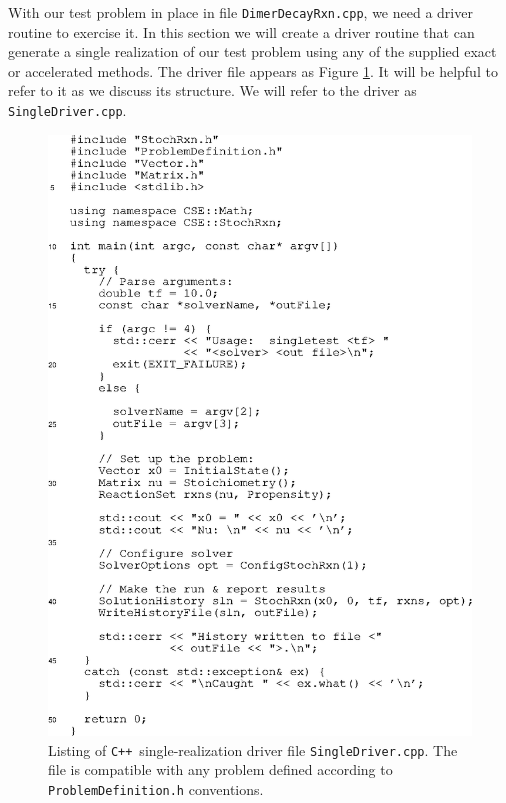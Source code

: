 \documentclass[12pt]{article}
\newcommand{\cpp}{\texttt{C++}}%
\newcommand{\api}[1]{\texttt{#1}}
\begin{document}
With our test problem in place in file \api{DimerDecayRxn.cpp}, we
need a driver routine to exercise it.  In this section we will create
a driver routine that can generate a single realization of our test
problem using any of the supplied exact or accelerated methods.  The
driver file appears as Figure \ref{singletest_cpp}. It will be
helpful to refer to it as we discuss its structure.  We will refer to
the driver as \api{SingleDriver.cpp}.
\begin{figure}[htbp]
  \centering \includegraphics{singletest_cpp.eps}
  \caption{Listing of \cpp\ single-realization driver file
           \api{SingleDriver.cpp}.  The file is compatible with any
           problem defined according to \api{Prob\-lem\-Def\-ini\-tion.h}
           conventions.}
  \label{singletest_cpp}
\end{figure}
\end{document}
